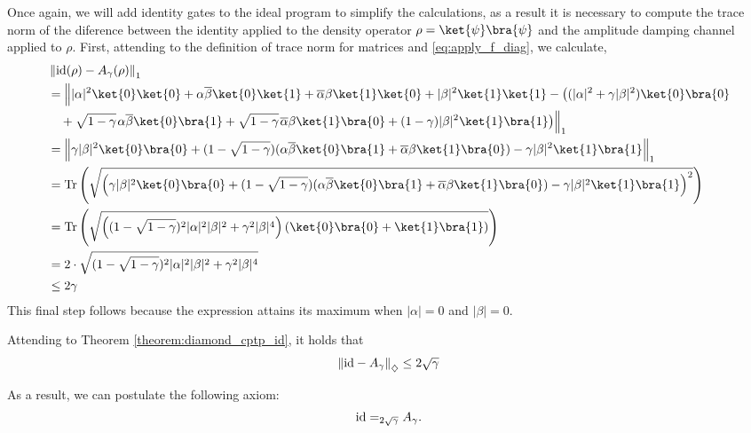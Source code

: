 \begin{example}
Once again, we will add identity gates to the ideal program to simplify the calculations, as a result it is necessary to compute the trace norm of the diference between the identity applied to the density operator $\rho = \ket{\psi} \bra{\psi}$ and the amplitude damping channel applied to $\rho$.
First, attending to the definition of trace norm for matrices and \autoref{eq:apply_f_diag}, we calculate, 
\begin{align*}
  & \tracenorm{ \id(\rho) - A_{\gamma}(\rho)} \\
  & =    \Big\lVert  |\alpha|^{2} \ket{0} \ket{0} + \alpha \overline{\beta} \ket{0} \ket{1} + \overline{\alpha} \beta \ket{1} \ket{0} + |\beta|^{2} \ket{1} \ket{1}  - \big((|\alpha|^{2} + \gamma |\beta|^{2}) \ket{0}\bra{0} \\ 
  & \hspace{10pt}  +  \sqrt{1-\gamma} \hspace{1pt} \alpha \overline{\beta} \ket{0}\bra{1} + \sqrt{1-\gamma} \hspace{1pt} \overline{\alpha} \beta \ket{1}\bra{0} + (1-\gamma) |\beta|^{2} \ket{1}\bra{1}\big) \Big\rVert_1 \\
   & = \tracenorm{\gamma |\beta|^{2} \ket{0} \bra{0} + (1-\sqrt{1-\gamma}) (\alpha \overline{\beta} \ket{0} \bra{1} + \overline{\alpha} \beta \ket{1} \bra{0}) - \gamma |\beta|^{2} \ket{1} \bra{1}} \\
   & = \tr \left( \sqrt{\left( \gamma |\beta|^{2} \ket{0} \bra{0} + (1-\sqrt{1-\gamma}) (\alpha \overline{\beta} \ket{0} \bra{1} + \overline{\alpha} \beta \ket{1} \bra{0}) - \gamma |\beta|^{2} \ket{1} \bra{1}  \right)^2}\right) \\
   & = \tr \left( \sqrt{\left( (1-\sqrt{1-\gamma})^{2} |\alpha|^{2}|\beta|^{2} + \gamma^{2} |\beta|^{4} \right) (\ket{0} \bra{0} + \ket{1} \bra{1} ) } \right) \\
   & = 2 \cdot \sqrt{  (1-\sqrt{1-\gamma})^{2} |\alpha|^{2}|\beta|^{2} + \gamma^{2} |\beta|^{4}} \\
   & \leq 2 \gamma
\end{align*}
This final step follows because the expression attains its maximum when 
$|\alpha|=0 $ and $|\beta|=0.$

Attending to Theorem \ref{theorem:diamond_cptp_id}, it holds that
\begin{align*}
  \left\lVert  \mathrm{id} - A_\gamma \right\rVert_{\diamondsuit} \leq 2 \sqrt{\gamma}
\end{align*}

As a result, we can postulate the following axiom:
    \begin{align} \label{eq:amp_damp_teleport}
        \mathrm{id} =_{2 \sqrt{\gamma}} A_\gamma.
    \end{align}



\end{example}
